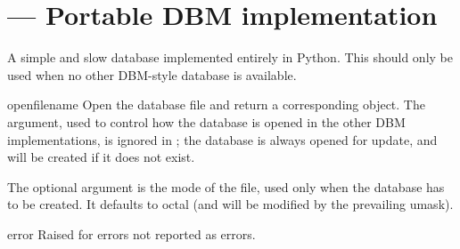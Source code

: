 \begin{seealso}
\end{seealso}


\section{ ---
         Portable DBM implementation}



A simple and slow database implemented entirely in Python.  This
should only be used when no other DBM-style database is available.


\begin{funcdesc}{open}{filename}
Open the database file  and return a corresponding
object.  The  argument, used to control how the database is
opened in the other DBM implementations, is ignored in
; the database is always opened for update, and will
be created if it does not exist.

The optional  argument is the \UNIX{} mode of the file, used
only when the database has to be created.  It defaults to octal
 (and will be modified by the prevailing umask).
\end{funcdesc}

\begin{excdesc}{error}
Raised for errors not reported as  errors.
\end{excdesc}


\begin{seealso}
\end{seealso}

